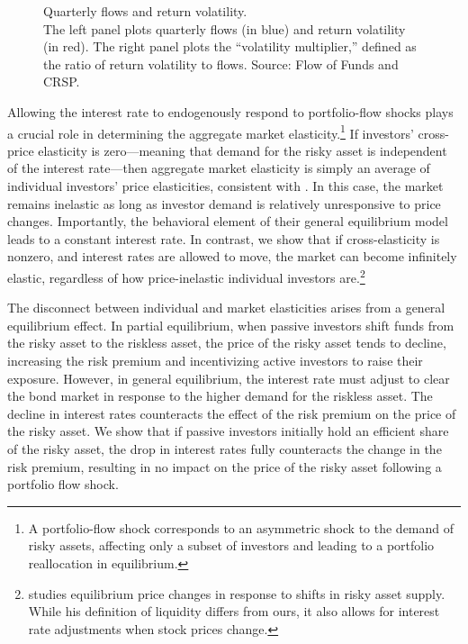 \begin{figure}[!t]
    \centering
    \subfloat{\resizebox{0.49\textwidth}{!}{}}
    \subfloat{\resizebox{0.49\textwidth}{!}{}}
    \caption{Quarterly flows and return volatility.\\ The left panel plots quarterly flows (in blue) and return volatility (in red). The right panel plots the ``volatility multiplier,'' defined as the ratio of return volatility to flows. Source: Flow of Funds and CRSP.}\label{fig:facts-vol-flow}
\end{figure}

Allowing the interest rate to endogenously respond to portfolio-flow shocks plays a crucial role in determining the aggregate market elasticity.\footnote{A portfolio-flow shock corresponds to an asymmetric shock to the demand of risky assets, affecting only a subset of investors and leading to a portfolio reallocation in equilibrium.} If investors' cross-price elasticity is zero---meaning that demand for the risky asset is independent of the interest rate---then aggregate market elasticity is simply an average of individual investors' price elasticities, consistent with \citet{gabaix2020search}. In this case, the market remains inelastic as long as investor demand is relatively unresponsive to price changes. 
Importantly, the behavioral element of their general equilibrium model leads to a constant interest rate.
In contrast, we show that if cross-elasticity is nonzero, and interest rates are allowed to move, the market can become infinitely elastic, regardless of how price-inelastic individual investors are.\footnote{\cite{johnson2006dynamic} studies equilibrium price changes in response to shifts in risky asset supply. While his definition of liquidity differs from ours, it also allows for interest rate adjustments when stock prices change.}

The disconnect between individual and market elasticities arises from a general equilibrium effect. 
In partial equilibrium, when passive investors shift funds from the risky asset to the riskless asset, the price of the risky asset tends to decline, increasing the risk premium and incentivizing active investors to raise their exposure. However, in general equilibrium, the interest rate must adjust to clear the bond market in response to the higher demand for the riskless asset. The decline in interest rates counteracts the effect of the risk premium on the price of the risky asset. We show that if passive investors initially hold an efficient share of the risky asset, the drop in interest rates fully counteracts the change in the risk premium, resulting in no impact on the price of the risky asset following a portfolio flow shock.

